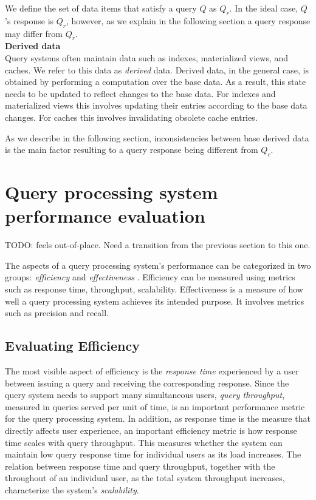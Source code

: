 We define the set of data items that satisfy a query $Q$ as $Q_r$.
In the ideal case, $Q$'s response is $Q_r$, however, as we explain in the following section a query response may
differ from $Q_r$. \\

\noindent
\textbf{Derived data} \\
Query systems often maintain data such as indexes, materialized views, and caches.
We refer to this data as \textit{derived} data.
Derived data, in the general case, is obtained by performing a computation over the base data.
As a result, this state needs to be updated to reflect changes to the base data.
For indexes and materialized views this involves updating their entries according to the base data changes.
For caches this involves invalidating obsolete cache entries.

As we describe in the following section, inconsistencies between base derived data is the main factor
resulting to a query response being different from $Q_r$.

\section{Query processing system performance evaluation}
\label{sec:requirements}

TODO: feels out-of-place. Need a transition from the previous section to this one.

The aspects of a query processing system's performance can be categorized in two groups:
\textit{efficiency} and \textit{effectiveness} \cite{buttcher:informationretrieval}.
Efficiency can be measured using metrics such as response time, throughput, scalability.
Effectiveness is a measure of how well a query processing system achieves its intended purpose.
It involves metrics such as precision and recall.


\subsection{Evaluating Efficiency}

The most visible aspect of efficiency is the \textit{response time} experienced by a user between issuing a query and
receiving the corresponding response.
Since the query system needs to support many simultaneous users, \textit{query throughput}, measured in queries served
per unit of time, is an important performance metric for the query processing system.
In addition, as response time is the measure that directly affects user experience, an important efficiency metric is
how response time scales with query throughput.
This measures whether the system can maintain low query response time for individual users as its load increases.
The relation between response time and query throughput, together with the throughout of an individual user, as the
total system throughput increases, characterize the system's \textit{scalability}.

